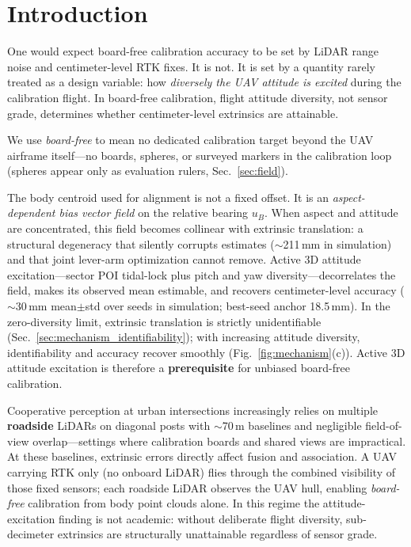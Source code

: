 \section{Introduction}
\label{sec:intro}

One would expect board-free calibration accuracy to be set by LiDAR range noise and
centimeter-level RTK fixes.
It is not.
It is set by a quantity rarely treated as a design variable: how \emph{diversely the
UAV attitude is excited} during the calibration flight.
In board-free calibration, flight attitude diversity, not sensor grade, determines
whether centimeter-level extrinsics are attainable.

We use \emph{board-free} to mean no dedicated calibration target beyond the UAV
airframe itself---no boards, spheres, or surveyed markers in the calibration loop
(spheres appear only as evaluation rulers, Sec.~\ref{sec:field}).

The body centroid used for alignment is not a fixed offset.
It is an \emph{aspect-dependent bias vector field} on the relative bearing $u_B$.
When aspect and attitude are concentrated, this field becomes collinear with
extrinsic translation: a structural degeneracy that silently corrupts estimates
($\sim$211\,mm in simulation) and that joint lever-arm optimization cannot remove.
Active 3D attitude excitation---sector POI tidal-lock plus pitch and yaw
diversity---decorrelates the field, makes its observed mean estimable, and recovers
centimeter-level accuracy ($\sim$30\,mm mean$\pm$std over seeds in simulation;
best-seed anchor 18.5\,mm).
In the zero-diversity limit, extrinsic translation is strictly unidentifiable
(Sec.~\ref{sec:mechanism_identifiability}); with increasing attitude diversity,
identifiability and accuracy recover smoothly (Fig.~\ref{fig:mechanism}(c)).
Active 3D attitude excitation is therefore a \textbf{prerequisite} for unbiased
board-free calibration.

Cooperative perception at urban intersections increasingly relies on multiple
\textbf{roadside} LiDARs on diagonal posts with $\sim$70\,m baselines and negligible
field-of-view overlap---settings where calibration boards and shared views are
impractical.
At these baselines, extrinsic errors directly affect fusion and association.
A UAV carrying RTK only (no onboard LiDAR) flies through the combined visibility of
those fixed sensors; each roadside LiDAR observes the UAV hull, enabling
\emph{board-free} calibration from body point clouds alone.
In this regime the attitude-excitation finding is not academic: without deliberate
flight diversity, sub-decimeter extrinsics are structurally unattainable regardless
of sensor grade.

